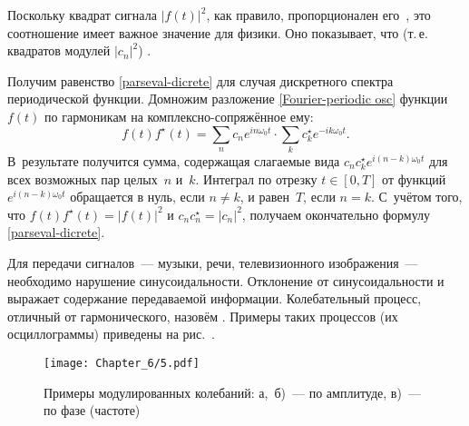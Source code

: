 Поскольку квадрат сигнала $|f(t)|^2$, как правило, пропорционален
его~, это соотношение имеет важное значение для физики.
Оно показывает, что  (т.\,е. квадратов модулей $|c_n|^2$)
.

Получим равенство \eqref{parseval-dicrete} для случая дискретного спектра
периодической функции. 
Домножим разложение
\eqref{Fourier-periodic osc} функции $f(t)$ по гармоникам на комплексно-сопряжённое 
ему:
\begin{equation*}f(t)f^{\star}(t) = \sum\limits_n c_n e^{i n \omega_0 t} \cdot \sum\limits_k c_k^{\star} e^{-i k \omega_0 t}.\end{equation*}
В~результате получится сумма, содержащая слагаемые вида
$c_n c_k^{\star} e^{i(n-k)\omega_0 t}$ для всех возможных пар целых~$n$ и~$k$.
Интеграл по отрезку $t\in[0,T]$ от функций $e^{i(n-k)\omega_0 t}$
обращается в нуль, если $n\ne k$, и равен~$T$, если $n=k$.
С~учётом того, что $f(t)f^{\star}(t) = |f(t)|^2$ и
$c_n c_n^{\star} = |c_n|^2$, получаем окончательно формулу
\eqref{parseval-dicrete}.




Для передачи сигналов~--- музыки, речи, телевизионного изображения~---
необходимо нарушение синусоидальности. Отклонение
от синусоидальности и выражает содержание передаваемой информации. Колебательный
процесс, отличный от гармонического,
назовём . Примеры таких процессов (их
осциллограммы) приведены на рис.~.

\begin{figure}[h!]
    \texttt{[image: Chapter\_6/5.pdf]}
    \caption{Примеры модулированных колебаний: а,~б)~--- по амплитуде,
    в)~--- по фазе (частоте)}
\end{figure}

